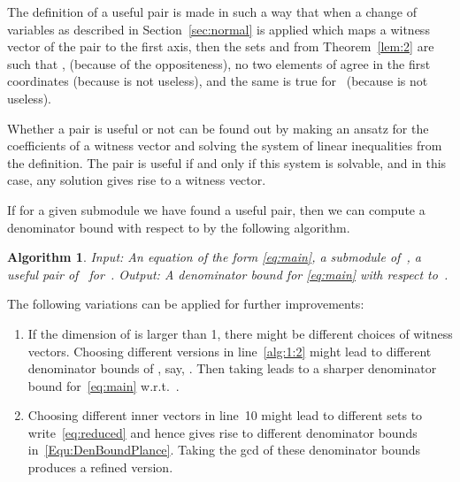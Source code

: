\documentclass[a4paper]{sig-alternate}
\newtheorem{algorithm}{Algorithm}
\begin{document}
The definition of a useful pair is made in such a way that when a change of variables as
described in Section~\ref{sec:normal} is applied which maps a witness vector of the pair
to the first axis, then the sets  and  from Theorem~\ref{lem:2} are such that
,  (because of the oppositeness), no two elements of 
agree in the first  coordinates (because  is not useless), and the
same is true for~ (because  is not useless).

Whether a pair  is useful or not can be found out by making an
ansatz for the coefficients of a witness vector and solving the system of linear
inequalities from the definition. The pair is useful if and only if this system is
solvable, and in this case, any solution gives rise to a witness vector.

If for a given submodule  we have found a useful pair, then we can compute a denominator
bound with respect to  by the following algorithm.

\begin{algorithm}\label{algo:1}
\emph{Input:} An equation of the form \eqref{eq:main}, a submodule  of~,
   a useful pair  of~ for~.
\emph{Output:} A denominator bound for \eqref{eq:main} with respect to~.

\begin{algo}
  \label{alg:1:2}
  ^^I^^I^^I
  ^^I^^I^^I
  ^^I^^I^^I
  ^^I^^I^^I
  \label{a:1:11}
  \end{algo}
\end{algorithm}

The following variations can be applied for further improvements:

\begin{enumerate}
\item If the dimension of  is larger than 1, there might be different choices
  of witness vectors. Choosing different versions in line~\ref{alg:1:2} might
  lead to different denominator bounds of , say, . Then taking
   leads to a sharper denominator bound
  for~\eqref{eq:main} w.r.t.\ .

\item Choosing different inner vectors in line~10 might lead to different sets 
to write~\eqref{eq:reduced} and hence gives rise to different denominator bounds in~\eqref{Equ:DenBoundPlance}. Taking the gcd of these denominator bounds produces a refined version.
\end{enumerate}
\end{document}
